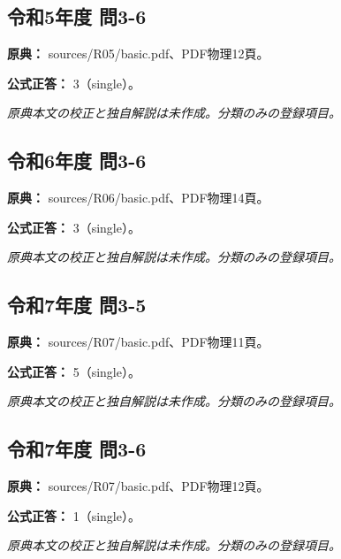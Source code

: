 \subsection{令和5年度 問3-6}
\label{q:r05-reg-basic-3-6}

\noindent\textbf{原典：} sources/R05/basic.pdf、PDF物理12頁。

\textbf{公式正答：} 3（single）。

\par\textit{原典本文の校正と独自解説は未作成。分類のみの登録項目。}

\subsection{令和6年度 問3-6}
\label{q:r06-reg-basic-3-6}

\noindent\textbf{原典：} sources/R06/basic.pdf、PDF物理14頁。

\textbf{公式正答：} 3（single）。

\par\textit{原典本文の校正と独自解説は未作成。分類のみの登録項目。}

\subsection{令和7年度 問3-5}
\label{q:r07-reg-basic-3-5}

\noindent\textbf{原典：} sources/R07/basic.pdf、PDF物理11頁。

\textbf{公式正答：} 5（single）。

\par\textit{原典本文の校正と独自解説は未作成。分類のみの登録項目。}

\subsection{令和7年度 問3-6}
\label{q:r07-reg-basic-3-6}

\noindent\textbf{原典：} sources/R07/basic.pdf、PDF物理12頁。

\textbf{公式正答：} 1（single）。

\par\textit{原典本文の校正と独自解説は未作成。分類のみの登録項目。}
